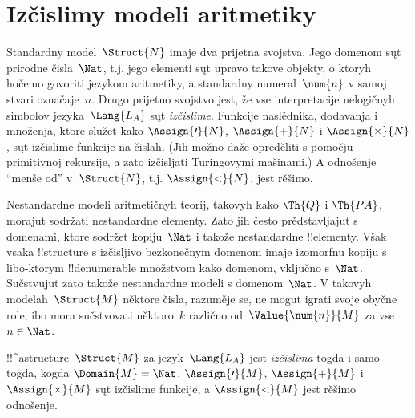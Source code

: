 \documentclass[../../../include/open-logic-section]{subfiles}
\begin{document}
\section{Izčislimy modeli aritmetiky}

\begin{explain}
Standardny model~$\Struct{N}$ imaje dva prijetna svojstva. Jego domenom
sųt prirodne čisla~$\Nat$, t.j. jego elementi sųt upravo takove
objekty, o ktoryh hočemo govoriti jezykom aritmetiky, a standardny
numeral~$\num{n}$ v samoj stvari označaje~$n$. Drugo prijetno svojstvo
jest, že vse interpretacije nelogičnyh simbolov jezyka~$\Lang{L_A}$
sųt \emph{izčislime}. Funkcije naslědnika, dodavanja i množenja, ktore
služet kako $\Assign{\prime}{N}$, $\Assign{+}{N}$ i
$\Assign{\times}{N}$, sųt izčislime funkcije na čislah. (Jih možno
daže opreděliti s pomočju primitivnoj rekursije, a zato izčisljati
Turingovymi mašinami.) A odnošenje ``menše od'' v~$\Struct{N}$, t.j.
$\Assign{<}{N}$, jest rěšimo.

Nestandardne modeli aritmetičnyh teorij, takovyh kako $\Th{Q}$ i
$\Th{PA}$, morajut sodržati nestandardne elementy. Zato jih često
prědstavljajut s domenami, ktore sodržet kopiju~$\Nat$ i takože
nestandardne !!{element}y. Však vsaka !!{structure} s izčisljivo
bezkonečnym domenom imaje izomorfnu kopiju s libo-ktorym
!!{denumerable} množstvom kako domenom, vključno s~$\Nat$.
Sučstvujut zato takože nestandardne modeli s domenom~$\Nat$. V takovyh
modelah~$\Struct{M}$ něktore čisla, razuměje se, ne mogut igrati svoje
obyčne role, ibo mora sučstvovati něktoro~$k$ različno
od~$\Value{\num{n}}{M}$ za vse~$n \in \Nat$.
\end{explain}

\begin{defn}
!!^a{structure}~$\Struct{M}$ za jezyk~$\Lang{L_A}$ jest
\emph{izčislima} togda i samo togda, kogda $\Domain{M} = \Nat$,
$\Assign{\prime}{M}$, $\Assign{+}{M}$ i $\Assign{\times}{M}$ sųt
izčislime funkcije, a $\Assign{<}{M}$ jest rěšimo odnošenje.
\end{defn}
\end{document}
